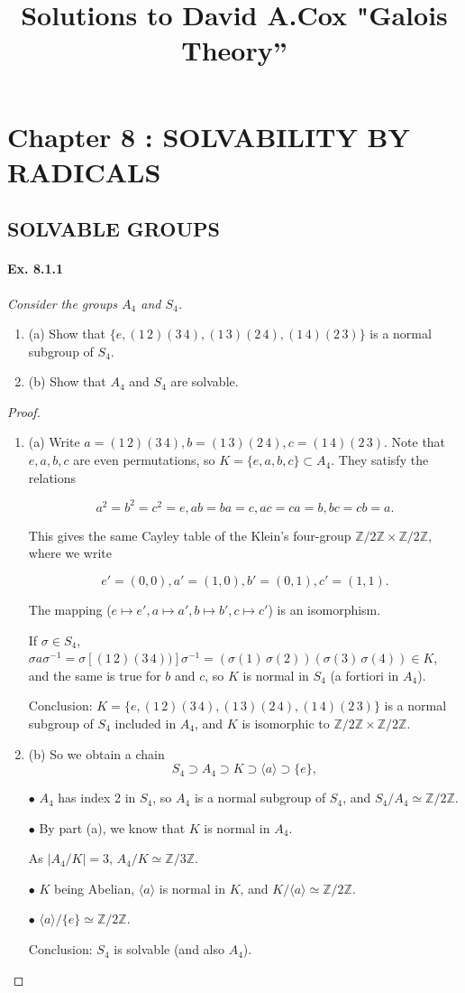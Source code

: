 \documentclass[11pt,a4paper]{article}
\title{Solutions to David A.Cox  "Galois Theory''}
\newcommand{\be} {\begin{enumerate}}
\newcommand{\ee} {\end{enumerate}}
\begin{document}
\section{Chapter 8 : SOLVABILITY BY RADICALS}

\subsection{SOLVABLE GROUPS}
\paragraph{Ex. 8.1.1}

{\it Consider the groups $A_4$ and $S_4$.
\be
\item[(a)] Show that $\{e,(1\, 2)(3\, 4), (1\, 3)(2\, 4), (1\, 4)(2\, 3)\}$ is a normal subgroup of $S_4$.
\item[(b)] Show that $A_4$ and $S_4$ are solvable.
\ee
}

\begin{proof}
\be
\item[(a)] Write $a = (1\,2)(3\,4), b = (1\,3)(2\,4),c=(1\,4)(2\,3)$. Note that $e, a,b, c$ are even permutations, so $K = \{e,a,b,c\}\subset A_4$. They satisfy the relations

$$a^2 = b^2=c^2=e, a b = b a = c, a c = c a = b, b c = c b =a.$$

This gives the same Cayley table of the Klein's four-group $\mathbb{Z}/2 \mathbb{Z} \times \mathbb{Z}/2 \mathbb{Z}$, where we write

$$e' = (0,0) , a' = (1,0), b' = (0,1) , c' = (1,1).$$

The mapping ($e\mapsto e', a\mapsto a',b\mapsto b',c\mapsto c'$)  is an isomorphism.

If $\sigma \in S_4$, $\sigma  a \sigma^{-1} = \sigma [(1\,2)(3\,4))] \sigma^{-1}= (\sigma(1)\, \sigma(2)) (\sigma(3)\, \sigma(4)) \in K$, and the same is true for $b$ and $c$, so $K$ is normal in $S_4$ (a fortiori in $A_4$).

Conclusion: $K =  \{e,(1\, 2)(3\, 4), (1\, 3)(2\, 4), (1\, 4)(2\, 3)\}$ is a normal subgroup of $S_4$ included in $A_4$, and $K$ is isomorphic to $\mathbb{Z}/2 \mathbb{Z} \times \mathbb{Z}/2 \mathbb{Z}$.


\item[(b)] So we obtain a chain $$S_4 \supset A_4 \supset K \supset \langle a \rangle\supset  \{e\},$$ 

$\bullet$ $A_4$ has index 2 in $S_4$, so $A_4$ is a normal subgroup of $S_4$, 
and $S_4/A_4 \simeq \mathbb{Z}/2 \mathbb{Z}$.

$\bullet$ By part (a), we know that $K$ is normal in $A_4$.

As $\vert A_4/K \vert = 3$, $A_4/K \simeq \mathbb{Z}/3 \mathbb{Z}$.

$\bullet$ $K$ being Abelian, $\langle a \rangle$ is normal in $K$, and $K/ \langle a \rangle  \simeq \mathbb{Z}/2 \mathbb{Z}$.

$\bullet$ $ \langle a \rangle/\{e\} \simeq \mathbb{Z}/2 \mathbb{Z}$.

Conclusion: $S_4$ is solvable (and also $A_4$).
\ee
\end{proof}
\end{document}
